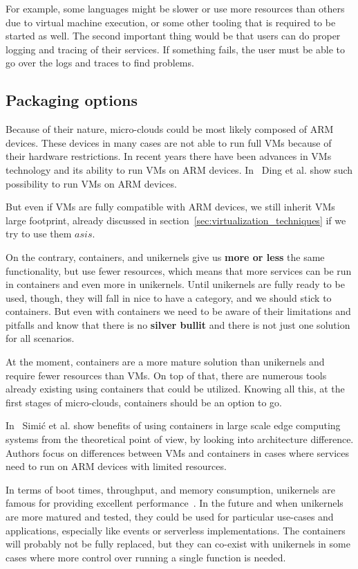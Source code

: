 For example, some languages might be slower or use more resources than others due to virtual machine execution, or some other tooling that is required to be started as well. The second important thing would be that users can do proper logging and tracing of their services. If something fails, the user must be able to go over the logs and traces to find problems.
%
\subsection{Packaging options}\label{sec:packaging}
%
Because of their nature, micro-clouds could be most likely composed of ARM devices. These devices in many cases are not able to run full VMs because of their hardware restrictions. In recent years there have been advances in VMs technology and its ability to run VMs on ARM devices. In~\cite{Ding12armvisor} Ding et al. show such possibility to run VMs on ARM devices.

But even if VMs are fully compatible with ARM devices, we still inherit VMs large footprint, already discussed in section~\ref{sec:virtualization_techniques} if we try to use them $as is$.

On the contrary, containers, and unikernels give us \textbf{more or less} the same functionality, but use fewer resources, which means that more services can be run in containers and even more in unikernels. Until unikernels are fully ready to be used, though, they will fall in nice to have a category, and we should stick to containers. But even with containers we need to be aware of their limitations and pitfalls and know that there is no \textbf{silver bullit} and there is not just one solution for all scenarios.

At the moment, containers are a more mature solution than unikernels and require fewer resources than VMs. On top of that, there are numerous tools already existing using containers that could be utilized. Knowing all this, at the first stages of micro-clouds, containers should be an option to go. 

In~\cite{inproceedingsSimic3} Simi\' c et al. show benefits of using containers in large scale edge computing systems from the theoretical point of view, by looking into architecture difference. Authors focus on differences between VMs and containers in cases where services need to run on ARM devices with limited resources.

In terms of boot times, throughput, and memory consumption, unikernels are famous for providing excellent performance~\cite{abs-2104-12721}. In the future and when unikernels are more matured and tested, they could be used for particular use-cases and applications, especially like events or serverless implementations. The containers will probably not be fully replaced, but they can co-exist with unikernels in some cases where more control over running a single function is needed.


